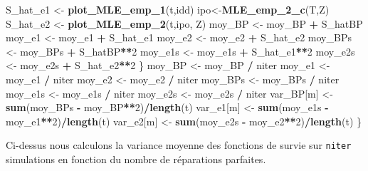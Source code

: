 \documentclass[
]{article}
\newenvironment{Shaded}{\begin{snugshade}}{\end{snugshade}}
\newcommand{\DecValTok}[1]{\textcolor[rgb]{0.00,0.00,0.81}{#1}}
\newcommand{\FunctionTok}[1]{\textcolor[rgb]{0.13,0.29,0.53}{\textbf{#1}}}
\newcommand{\NormalTok}[1]{#1}
\newcommand{\OtherTok}[1]{\textcolor[rgb]{0.56,0.35,0.01}{#1}}
\newcommand{\SpecialCharTok}[1]{\textcolor[rgb]{0.81,0.36,0.00}{\textbf{#1}}}
\begin{document}
\begin{Shaded}
\begin{Highlighting}[]
\NormalTok{    S\_hat\_e1 }\OtherTok{\textless{}{-}} \FunctionTok{plot\_MLE\_emp\_1}\NormalTok{(t,idd)}
\NormalTok{    ipo}\OtherTok{\textless{}{-}}\FunctionTok{MLE\_emp\_2\_c}\NormalTok{(T,Z)}
\NormalTok{    S\_hat\_e2 }\OtherTok{\textless{}{-}} \FunctionTok{plot\_MLE\_emp\_2}\NormalTok{(t,ipo, Z)}
\NormalTok{    moy\_BP }\OtherTok{\textless{}{-}}\NormalTok{ moy\_BP }\SpecialCharTok{+}\NormalTok{ S\_hatBP}
\NormalTok{    moy\_e1 }\OtherTok{\textless{}{-}}\NormalTok{ moy\_e1 }\SpecialCharTok{+}\NormalTok{ S\_hat\_e1}
\NormalTok{    moy\_e2 }\OtherTok{\textless{}{-}}\NormalTok{ moy\_e2 }\SpecialCharTok{+}\NormalTok{ S\_hat\_e2}
\NormalTok{    moy\_BPs }\OtherTok{\textless{}{-}}\NormalTok{ moy\_BPs }\SpecialCharTok{+}\NormalTok{ S\_hatBP}\SpecialCharTok{**}\DecValTok{2}
\NormalTok{    moy\_e1s }\OtherTok{\textless{}{-}}\NormalTok{ moy\_e1s }\SpecialCharTok{+}\NormalTok{ S\_hat\_e1}\SpecialCharTok{**}\DecValTok{2}
\NormalTok{    moy\_e2s }\OtherTok{\textless{}{-}}\NormalTok{ moy\_e2s }\SpecialCharTok{+}\NormalTok{ S\_hat\_e2}\SpecialCharTok{**}\DecValTok{2}
\NormalTok{  \}}
\NormalTok{  moy\_BP }\OtherTok{\textless{}{-}}\NormalTok{ moy\_BP }\SpecialCharTok{/}\NormalTok{ niter}
\NormalTok{  moy\_e1 }\OtherTok{\textless{}{-}}\NormalTok{ moy\_e1 }\SpecialCharTok{/}\NormalTok{ niter}
\NormalTok{  moy\_e2 }\OtherTok{\textless{}{-}}\NormalTok{ moy\_e2 }\SpecialCharTok{/}\NormalTok{ niter}
\NormalTok{  moy\_BPs }\OtherTok{\textless{}{-}}\NormalTok{ moy\_BPs }\SpecialCharTok{/}\NormalTok{ niter}
\NormalTok{  moy\_e1s }\OtherTok{\textless{}{-}}\NormalTok{ moy\_e1s }\SpecialCharTok{/}\NormalTok{ niter}
\NormalTok{  moy\_e2s }\OtherTok{\textless{}{-}}\NormalTok{ moy\_e2s }\SpecialCharTok{/}\NormalTok{ niter}
\NormalTok{  var\_BP[m] }\OtherTok{\textless{}{-}} \FunctionTok{sum}\NormalTok{(moy\_BPs }\SpecialCharTok{{-}}\NormalTok{ moy\_BP}\SpecialCharTok{**}\DecValTok{2}\NormalTok{)}\SpecialCharTok{/}\FunctionTok{length}\NormalTok{(t)}
\NormalTok{  var\_e1[m] }\OtherTok{\textless{}{-}} \FunctionTok{sum}\NormalTok{(moy\_e1s }\SpecialCharTok{{-}}\NormalTok{ moy\_e1}\SpecialCharTok{**}\DecValTok{2}\NormalTok{)}\SpecialCharTok{/}\FunctionTok{length}\NormalTok{(t)}
\NormalTok{  var\_e2[m] }\OtherTok{\textless{}{-}} \FunctionTok{sum}\NormalTok{(moy\_e2s }\SpecialCharTok{{-}}\NormalTok{ moy\_e2}\SpecialCharTok{**}\DecValTok{2}\NormalTok{)}\SpecialCharTok{/}\FunctionTok{length}\NormalTok{(t)}
\NormalTok{\}}
\end{Highlighting}
\end{Shaded}

Ci-dessus nous calculons la variance moyenne des fonctions de survie sur
\texttt{niter} simulations en fonction du nombre de réparations
parfaites.
\end{document}
